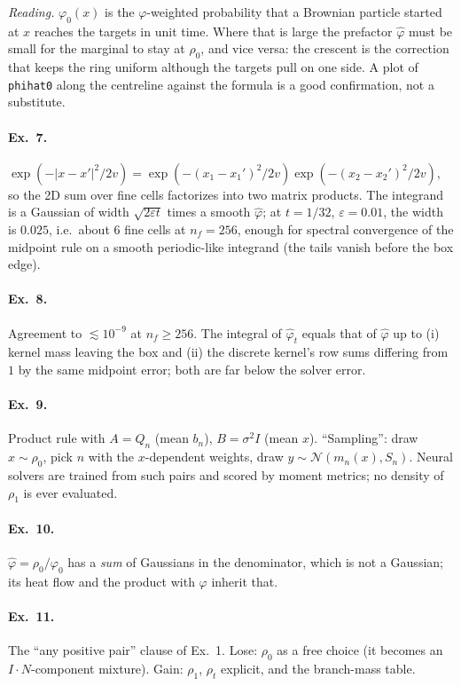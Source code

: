 \documentclass[11pt]{article}
\newcommand{\eps}{\varepsilon}
\newcommand{\code}[1]{\texttt{#1}}
\newcommand{\Nc}{\mathcal{N}}
\newcommand{\hphi}{\hat\varphi}
\newcounter{ex}
\begin{document}
\emph{Reading.} $\varphi_0(x)$ is the $\varphi$-weighted probability that a Brownian particle
started at $x$ reaches the targets in unit time. Where that is large the prefactor $\hphi$
must be small for the marginal to stay at $\rho_0$, and vice versa: the crescent is the
correction that keeps the ring uniform although the targets pull on one side. A plot of
\code{phihat0} along the centreline against the formula is a good confirmation, not a
substitute.

\paragraph{Ex.\ 7.} $\exp(-|x-x'|^2/2v)=\exp(-(x_1-x_1')^2/2v)\exp(-(x_2-x_2')^2/2v)$, so the
2D sum over fine cells factorizes into two matrix products. The integrand is a Gaussian of
width $\sqrt{2\eps t}$ times a smooth $\hphi$; at $t=1/32$, $\eps=0.01$, the width is
$0.025$, i.e.\ about $6$ fine cells at $n_f=256$, enough for spectral convergence of the
midpoint rule on a smooth periodic-like integrand (the tails vanish before the box edge).

\paragraph{Ex.\ 8.} Agreement to $\lesssim10^{-9}$ at $n_f\ge256$. The integral of $\hphi_t$
equals that of $\hphi$ up to (i) kernel mass leaving the box and (ii) the discrete kernel's
row sums differing from $1$ by the same midpoint error; both are far below the solver error.

\paragraph{Ex.\ 9.} Product rule with $A=Q_n$ (mean $b_n$), $B=\sigma^2I$ (mean $x$).
``Sampling'': draw $x\sim\rho_0$, pick $n$ with the $x$-dependent weights, draw
$y\sim\Nc(m_n(x),S_n)$. Neural solvers are trained from such pairs and scored by moment
metrics; no density of $\rho_1$ is ever evaluated.

\paragraph{Ex.\ 10.} $\hphi=\rho_0/\varphi_0$ has a \emph{sum} of Gaussians in the
denominator, which is not a Gaussian; its heat flow and the product with $\varphi$ inherit
that.

\paragraph{Ex.\ 11.} The ``any positive pair'' clause of Ex.\ 1. Lose: $\rho_0$ as a free
choice (it becomes an $I\!\cdot\!N$-component mixture). Gain: $\rho_1$, $\rho_t$ explicit,
and the branch-mass table.
\end{document}
